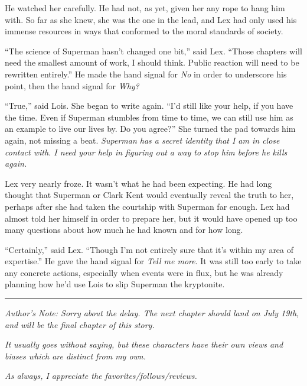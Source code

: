 He watched her carefully. He had not, as yet, given her any rope to hang
him with. So far as she knew, she was the one in the lead, and Lex had
only used his immense resources in ways that conformed to the moral
standards of society.

``The science of Superman hasn't changed one bit,'' said Lex. ``Those
chapters will need the smallest amount of work, I should think. Public
reaction will need to be rewritten entirely.'' He made the hand signal
for \emph{No} in order to underscore his point, then the hand signal for
\emph{Why?}

``True,'' said Lois. She began to write again. ``I'd still like your
help, if you have the time. Even if Superman stumbles from time to time,
we can still use him as an example to live our lives by. Do you agree?''
She turned the pad towards him again, not missing a beat. \emph{Superman
has a secret identity that I am in close contact with. I need your help
in figuring out a way to stop him before he kills again.}

Lex very nearly froze. It wasn't what he had been expecting. He had long
thought that Superman or Clark Kent would eventually reveal the truth to
her, perhaps after she had taken the courtship with Superman far enough.
Lex had almost told her himself in order to prepare her, but it would
have opened up too many questions about how much he had known and for
how long.

``Certainly,'' said Lex. ``Though I'm not entirely sure that it's within
my area of expertise.'' He gave the hand signal for \emph{Tell me more}.
It was still too early to take any concrete actions, especially when
events were in flux, but he was already planning how he'd use Lois to
slip Superman the kryptonite.

\begin{center}\rule{0.5\linewidth}{\linethickness}\end{center}

\emph{Author's Note: Sorry about the delay. The next chapter should land
on July 19th, and will be the final chapter of this story.}

\emph{It usually goes without saying, but these characters have their
own views and biases which are distinct from my own.}

\emph{As always, I appreciate the favorites/follows/reviews.}
